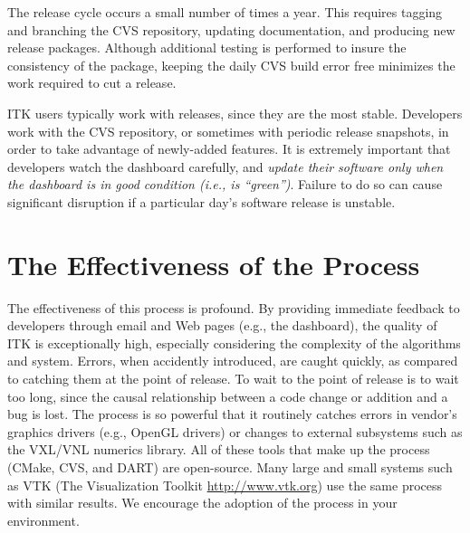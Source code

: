 The release cycle occurs a small number of times a year. This requires
tagging and branching the CVS repository, updating documentation, and
producing new release packages. Although additional testing is performed to
insure the consistency of the package, keeping the daily CVS build error free
minimizes the work required to cut a release.

ITK users typically work with releases, since they are the most
stable. Developers work with the CVS repository, or sometimes with periodic
release snapshots, in order to take advantage of newly-added features. It is
extremely important that developers watch the dashboard carefully, and
\emph{update their software only when the dashboard is in good condition
(i.e., is ``green'')}. Failure to do so can cause significant disruption if a
particular day's software release is unstable.

\section{The Effectiveness of the Process}
\label{sec:Effectiveness}

The effectiveness of this process is profound. By providing immediate
feedback to developers through email and Web pages (e.g., the dashboard), the
quality of ITK is exceptionally high, especially considering the complexity
of the algorithms and system. Errors, when accidently introduced, are caught
quickly, as compared to catching them at the point of release. To wait to the
point of release is to wait too long, since the causal relationship between a
code change or addition and a bug is lost. The process is so powerful that it
routinely catches errors in vendor's graphics drivers (e.g., OpenGL drivers)
or changes to external subsystems such as the VXL/VNL numerics library. All
of these tools that make up the process (CMake, CVS, and DART) are
open-source. Many large and small systems such as VTK (The Visualization
Toolkit \url{http://www.vtk.org}) use the same process with similar
results. We encourage the adoption of the process in your environment.

